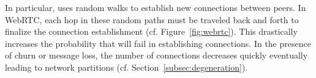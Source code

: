 
In particular, \SCAMP uses random walks to establish new connections
between peers. In WebRTC, each hop in these random paths must be
traveled back and forth to finalize the connection establishment
(cf. Figure~\ref{fig:webrtc}). This drastically increases the
probability that \SCAMP will fail in establishing connections. In the
presence of churn or message loss, the number of connections decreases
quickly eventually leading to network partitions
(cf. Section~\ref{subsec:degeneration}).





